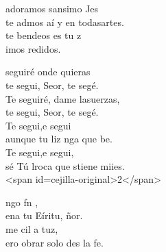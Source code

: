 \documentclass[12pt]{article}
\begin{document}
\begin{multicols*}{2}
\begin{cancion}[Te adoramos][]%
	adoramos sansimo Jes\\
	te admos aí y en todasartes.\\
	te bendeos es  tu z\\
	imos redidos.\\
\end{cancion}%

\begin{cancion}[Te seguiré][Ixcís]%
	seguiré onde quieras\\
	te segui, Seor, te segé. \\
	Te seguiré, dame lasuerzas,\\
	te segui, Seor, te segé. \\
	Te segui,e segui \\
	aunque tu liz nga que be. \\
	Te segui,e segui, \\
	sé Tú lroca que stiene miies.\\
<span id=cejilla-original>2</span>\\
\end{cancion}%

\begin{cancion}%
	ngo fn ,\\
	ena tu Eíritu, ñor.\\
	me cil a tuz,\\
	ero obrar  solo des la fe.\\
\end{cancion}%


\end{multicols*}
\end{document}
